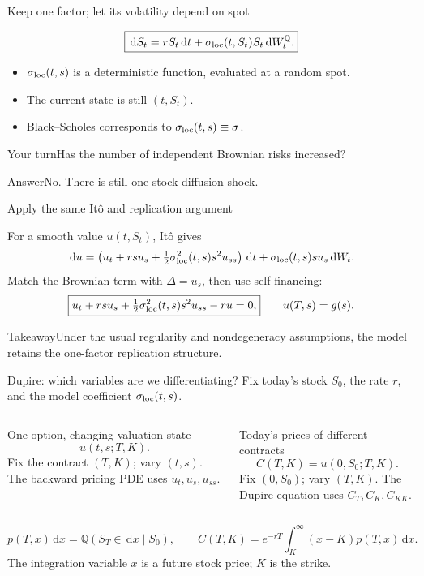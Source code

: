 \documentclass[handout,10pt,t,aspectratio=169]{beamer}
\newenvironment{pausebox}{\begin{block}{Your turn}}{\end{block}}
\newenvironment{answerbox}{\begin{exampleblock}{Answer}}{\end{exampleblock}}
\newenvironment{keybox}{\begin{exampleblock}{Takeaway}}{\end{exampleblock}}
\newcommand{\Q}{\mathbb Q}
\newcommand{\dd}{\,\mathrm d}
\begin{document}
\begin{frame}{Keep one factor; let its volatility depend on spot}

    \[\boxed{\dd S_t=rS_t\dd t+\sigma_{\rm loc}(t,S_t)S_t\dd W_t^\Q.}\]
    \begin{itemize}
    \item \(\sigma_{\rm loc}(t,s)\) is a deterministic function, evaluated at a random spot.
    \item The current state is still \((t,S_t)\).
    \item Black--Scholes corresponds to \(\sigma_{\rm loc}(t,s)\equiv\sigma\).
    \end{itemize}
    \begin{pausebox}Has the number of independent Brownian risks increased?\end{pausebox}
    \begin{answerbox}No. There is still one stock diffusion shock.\end{answerbox}
\end{frame}

\begin{frame}{Apply the same It\^o and replication argument}

    For a smooth value \(u(t,S_t)\), It\^o gives
    \[\dd u=\left(u_t+rsu_s+\tfrac12\sigma_{\rm loc}^2(t,s)s^2u_{ss}\right)\dd t
      +\sigma_{\rm loc}(t,s)s u_s\dd W_t.\]
    Match the Brownian term with \(\Delta=u_s\), then use self-financing:
    \[\boxed{u_t+rsu_s+\tfrac12\sigma_{\rm loc}^2(t,s)s^2u_{ss}-ru=0,}
       \qquad u(T,s)=g(s).\]
    \begin{keybox}Under the usual regularity and nondegeneracy assumptions,
    the model retains the one-factor replication structure.\end{keybox}
\end{frame}

\begin{frame}{Dupire: which variables are we differentiating?}
\small
Fix today's stock \(S_0\), the rate \(r\), and the model coefficient
\(\sigma_{\rm loc}(t,s)\).
\begin{columns}[T,onlytextwidth]
\begin{block}{One option, changing valuation state}
\[
u(t,s;T,K).
\]
Fix the contract \((T,K)\); vary \((t,s)\).
The backward pricing PDE uses \(u_t,u_s,u_{ss}\).
\end{block}
\begin{exampleblock}{Today's prices of different contracts}
\[
C(T,K)=u(0,S_0;T,K).
\]
Fix \((0,S_0)\); vary \((T,K)\).
The Dupire equation uses \(C_T,C_K,C_{KK}\).
\end{exampleblock}
\end{columns}
\[
p(T,x)\dd x=\Q(S_T\in\dd x\mid S_0),\qquad
C(T,K)=e^{-rT}\int_K^\infty(x-K)p(T,x)\dd x.
\]
The integration variable \(x\) is a future stock price; \(K\) is the strike.
\end{frame}
\end{document}

